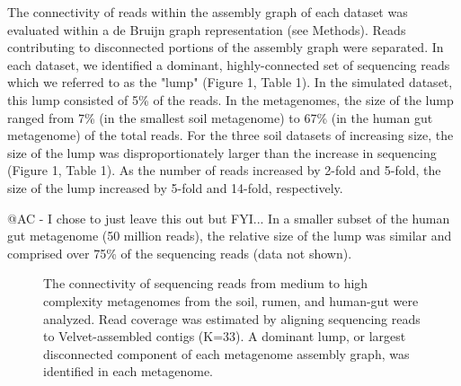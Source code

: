 \documentclass[11pt]{article} %
\begin{document}
The connectivity of reads within the assembly graph of each dataset was evaluated within a de Bruijn graph representation (see Methods).  Reads contributing to disconnected portions of the assembly graph were separated.  In each dataset, we identified a dominant, highly-connected set of sequencing reads which we referred to as the "lump" (Figure 1, Table 1).  In the simulated dataset, this lump consisted of 5\% of the reads.  In the metagenomes, the size of the lump ranged from 7\% (in the smallest soil metagenome) to 67\% (in the human gut metagenome) of the total reads.  For the three soil datasets of increasing size, the size of the lump was disproportionately larger than the increase in sequencing (Figure 1, Table 1).  As the number of reads increased by 2-fold and 5-fold, the size of the lump increased by 5-fold and 14-fold, respectively.  

@AC - I chose to just leave this out but FYI...  In a smaller subset of the human gut metagenome (50 million reads), the relative size of the lump was similar and comprised over 75\% of the sequencing reads (data not shown). 

\begin{figure}
\caption{The connectivity of sequencing reads from medium to high complexity metagenomes from the soil, rumen, and human-gut were analyzed.  Read coverage was estimated by aligning sequencing reads to Velvet-assembled contigs (K=33).  A dominant lump, or largest disconnected component of each metagenome assembly graph, was identified in each metagenome. }
\end{figure}
\end{document}
